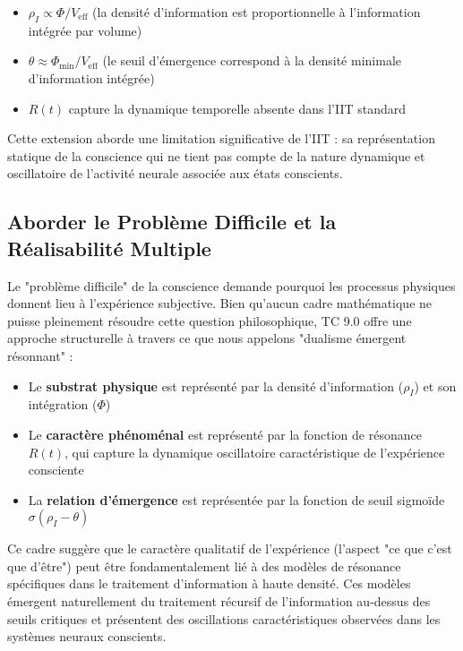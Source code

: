 \documentclass[12pt]{article}
\begin{document}
\begin{itemize}
    \item $\rho_I \propto \Phi / V_{\text{eff}}$ (la densité d'information est proportionnelle à l'information intégrée par volume)
    \item $\theta \approx \Phi_{\text{min}} / V_{\text{eff}}$ (le seuil d'émergence correspond à la densité minimale d'information intégrée)
    \item $R(t)$ capture la dynamique temporelle absente dans l'IIT standard
\end{itemize}

Cette extension aborde une limitation significative de l'IIT : sa représentation statique de la conscience qui ne tient pas compte de la nature dynamique et oscillatoire de l'activité neurale associée aux états conscients.

\subsection{Aborder le Problème Difficile et la Réalisabilité Multiple}
Le "problème difficile" de la conscience \cite{chalmers1995} demande pourquoi les processus physiques donnent lieu à l'expérience subjective. Bien qu'aucun cadre mathématique ne puisse pleinement résoudre cette question philosophique, TC 9.0 offre une approche structurelle à travers ce que nous appelons "dualisme émergent résonnant" :

\begin{itemize}
    \item Le \textbf{substrat physique} est représenté par la densité d'information ($\rho_I$) et son intégration ($\Phi$)
    
    \item Le \textbf{caractère phénoménal} est représenté par la fonction de résonance $R(t)$, qui capture la dynamique oscillatoire caractéristique de l'expérience consciente
    
    \item La \textbf{relation d'émergence} est représentée par la fonction de seuil sigmoïde $\sigma(\rho_I - \theta)$
\end{itemize}

Ce cadre suggère que le caractère qualitatif de l'expérience (l'aspect "ce que c'est que d'être") peut être fondamentalement lié à des modèles de résonance spécifiques dans le traitement d'information à haute densité. Ces modèles émergent naturellement du traitement récursif de l'information au-dessus des seuils critiques et présentent des oscillations caractéristiques observées dans les systèmes neuraux conscients.
\end{document}
